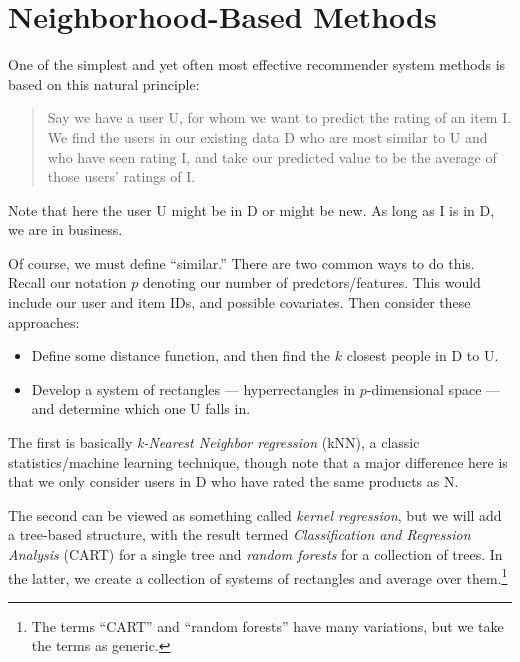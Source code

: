 \chapter{Neighborhood-Based Methods}  
\label{chap:knn}  

One of the simplest and yet often most effective recommender system
methods is based on this natural principle: 

\begin{quote}

Say we have a user U, for whom we want to predict the rating of an item I.
We find the users in our existing data D who are most similar to U and who
have seen rating I, and take our predicted value to be the average of
those users' ratings of I.  

\end{quote}

Note that here the user U might be in D or might be new.  As long as I
is in D, we are in business.

Of course, we must define ``similar.''  There are two common ways to do
this.  Recall our notation $p$ denoting our number of
predctors/features.  This would include our user and item IDs, and
possible covariates.  Then consider these approaches:

\begin{itemize}

\item Define some distance function, and then find the $k$ closest
people in D to U.  

\item Develop a system of rectangles --- hyperrectangles in
$p$-dimensional space --- and determine which one U falls in.  

\end{itemize} 

The first is basically \textit{k-Nearest Neighbor regression} (kNN), a
classic statistics/machine learning technique, though note that a major
difference here is that we only consider users in D who have rated the
same products as N.  

The second can be viewed as something called \textit{kernel regression}, 
but we will add a tree-based structure, with the result termed
\textit{Classification and Regression Analysis} (CART) for a single
tree and \textit{random forests} for a collection of trees.  In the
latter, we create a collection of systems of rectangles and average over
them.\footnote{The terms ``CART'' and ``random forests'' have 
many variations, but we take the terms as generic.}

